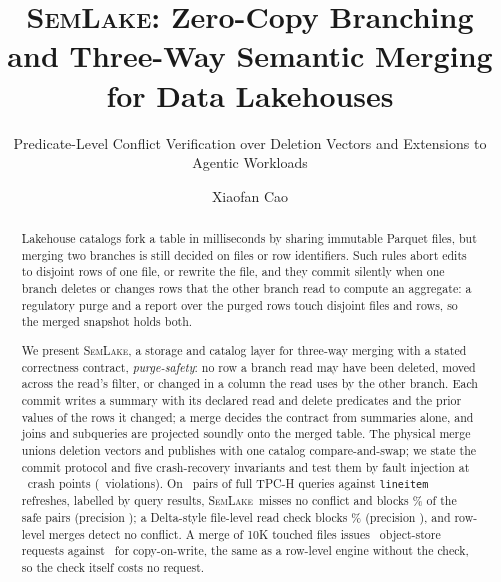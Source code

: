 \documentclass[sigconf, nonacm]{acmart}
\newcommand{\systemname}{\textsc{SemLake}}
\begin{document}
\title{\systemname: Zero-Copy Branching and Three-Way Semantic Merging for Data Lakehouses}
\subtitle{Predicate-Level Conflict Verification over Deletion Vectors and Extensions to Agentic Workloads}

\author{Xiaofan Cao}

\begin{abstract}
Lakehouse catalogs fork a table in milliseconds by sharing immutable Parquet files, but merging two branches is still decided on files or row identifiers. Such rules abort edits to disjoint rows of one file, or rewrite the file, and they commit silently when one branch deletes or changes rows that the other branch read to compute an aggregate: a regulatory purge and a report over the purged rows touch disjoint files and rows, so the merged snapshot holds both.

We present \systemname, a storage and catalog layer for three-way merging with a stated correctness contract, \emph{purge-safety}: no row a branch read may have been deleted, moved across the read's filter, or changed in a column the read uses by the other branch. Each commit writes a summary with its declared read and delete predicates and the prior values of the rows it changed; a merge decides the contract from summaries alone, and joins and subqueries are projected soundly onto the merged table. The physical merge unions deletion vectors and publishes with one catalog compare-and-swap; we state the commit protocol and five crash-recovery invariants and test them by fault injection at \RecPoints\ crash points (\RecViolations\ violations). On \FullPairs\ pairs of full TPC-H queries against \texttt{lineitem} refreshes, labelled by query results, \systemname\ misses no conflict and blocks \FullSemFBPct\% of the safe pairs (precision \FullSemPrec); a Delta-style file-level read check blocks \FullBoneRFBPct\% (precision \FullBoneRPrec), and row-level merges detect no conflict. A merge of 10K touched files issues \LedSemReq\ object-store requests against \LedBtwoReq\ for copy-on-write, the same as a row-level engine without the check, so the check itself costs no request.
\end{abstract}

\maketitle

\vldbtopmatter
\end{document}
